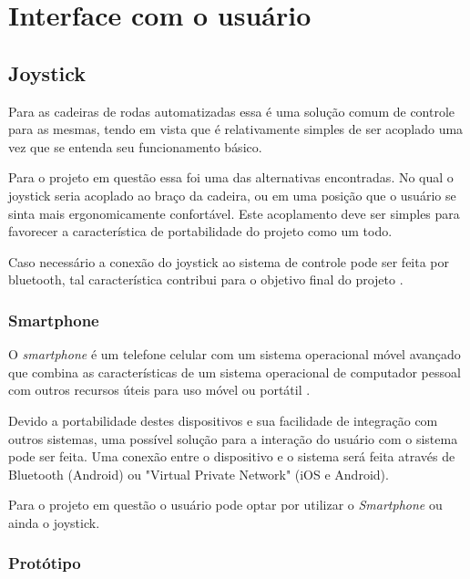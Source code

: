 \section{Interface com o usuário}


\subsection{Joystick}
Para as cadeiras de rodas automatizadas essa é uma solução comum de controle para as mesmas, tendo em vista que é relativamente simples de ser acoplado uma vez que se entenda seu funcionamento básico.

Para o projeto em questão essa foi uma das alternativas encontradas. No qual o joystick seria acoplado ao braço da cadeira, ou em uma posição que o usuário se sinta mais ergonomicamente confortável. Este acoplamento deve ser simples para favorecer a característica de portabilidade do projeto como um todo.

Caso necessário a conexão do joystick ao sistema de controle pode ser feita por bluetooth, tal característica contribui para o objetivo final do projeto \cite{artigo_joystick_controller}.

\subsubsection{Smartphone}
O \textit{smartphone} é um telefone celular com um sistema operacional móvel avançado que combina as características de um sistema operacional de computador pessoal com outros recursos úteis para uso móvel ou portátil \cite{article_smartphone}.

Devido a portabilidade destes dispositivos e sua facilidade de integração com outros sistemas, uma possível solução para a interação do usuário com o sistema pode ser feita. Uma conexão entre o dispositivo e o sistema será feita através de Bluetooth (Android) ou "Virtual Private Network" (iOS e Android).

Para o projeto em questão o usuário pode optar por utilizar o \textit{Smartphone} ou ainda o joystick.

\subsubsection{Protótipo}

